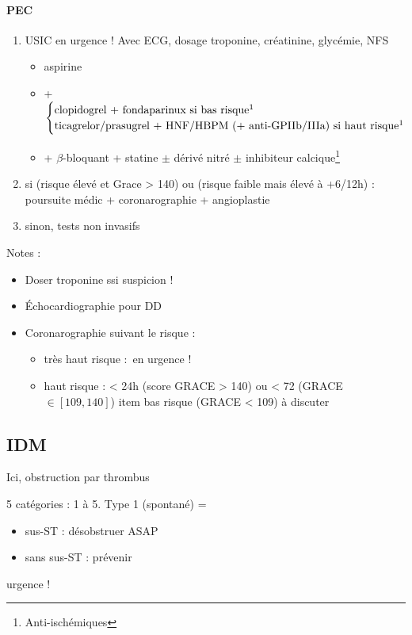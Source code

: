 \documentclass{article}
\begin{document}
\paragraph{PEC}
\begin{enumerate}
\item USIC en urgence ! Avec ECG, dosage troponine, créatinine, glycémie, NFS
  \begin{itemize}
  \item aspirine
  \item +
    $\begin{cases}
      \text{clopidogrel + fondaparinux si bas risque}\footnotemark\\
      \addtocounter{footnote}{-1}
\text{ticagrelor/prasugrel + HNF/HBPM (+ anti-GPIIb/IIIa) si haut risque}\footnotemark

\end{cases}$
  \item + $\beta$-bloquant + statine $\pm$ dérivé nitré $\pm$ inhibiteur
    calcique\footnote{Anti-ischémiques}
  \end{itemize}
\item si (risque élevé et Grace > 140) ou (risque faible mais élevé à +6/12h) :
  poursuite médic + coronarographie + angioplastie
\item sinon, tests non invasifs
\end{enumerate}

Notes :
\begin{itemize}
\item Doser troponine ssi suspicion !
\item Échocardiographie pour DD
\item Coronarographie suivant le risque :
\begin{itemize}
  \item très haut risque : en urgence !
  \item haut risque : < 24h (score GRACE > 140) ou < 72 (GRACE $\in [109, 140]$)
  item bas risque (GRACE < 109)  à discuter 
\end{itemize}
\end{itemize}

\subsection{IDM}

Ici, obstruction par thrombus

5 catégories : 1 à 5. Type 1 (spontané) =
\begin{itemize}
  \item sus-ST : désobstruer ASAP
  \item sans sus-ST : prévenir
\end{itemize}
\danger urgence ! \skull
\end{document}
